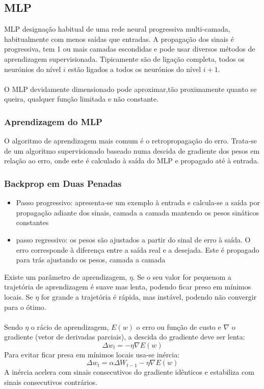 \documentclass[10pt,a4paper]{report}
\begin{document}
\subsection{MLP}
MLP designação habitual de uma rede neural progressiva multi-camada, habitualmente com menos saídas que entradas. A propagação dos sinais é progressiva, tem 1 ou mais camadas escondidas e pode usar diversos métodos de aprendizagem supervisionada. Tipicamente são de ligação completa, todos os neurónios do nível $i$ estão ligados a todos os neurónios do nível $i+1$.\\
\\
O MLP devidamente dimensionado pode aproximar,tão proximamente quanto se queira, qualquer função limitada e não constante.
\subsubsection{Aprendizagem do MLP}
O algoritmo de aprendizagem mais comum é o retropropagação do erro. Trata-se de um algoritmo supervisionado baseado numa descida de gradiente dos pesos em relação ao erro, onde este é calculado à saída do MLP e propagado até à entrada.
\subsubsection{Backprop em Duas Penadas}
\begin{itemize}
\item Passo progressivo: apresenta-se um exemplo à entrada e calcula-se a saída por propagação adiante dos sinais, camada a camada mantendo os pesos sináticos constantes
\item passo regressivo: os pesos são ajustados a partir do sinal de erro à saída. O erro corresponde à diferença entre a saída real e a desejada. Este é propagado para trás ajustando os pesos, camada a camada
\end{itemize}
Existe um parâmetro de aprendizagem, $\eta$. Se o seu valor for pequenom a trajetória de aprendizagem é suave mas lenta, podendo ficar preso em mínimos locais. Se $\eta$ for grande a trajetória é rápida, mas instável, podendo não convergir para o ótimo.\\
\\
Sendo $\eta$ o rácio de aprendizagem, $E(w)$ o erro ou função de custo e $\nabla$ o gradiente (vetor de derivadas parciais), a descida do gradiente deve ser lenta:
$$
\Delta w_t = -\eta \nabla E(w)
$$
Para evitar ficar presa em mínimos locais usa-se inércia:
$$
\Delta w_t = \alpha \Delta W_{t-1} - \eta \nabla E(w)
$$
A inércia acelera com sinais consecutivos do gradiente idênticos e estabiliza com sinais consecutivos contrários.
\end{document}

